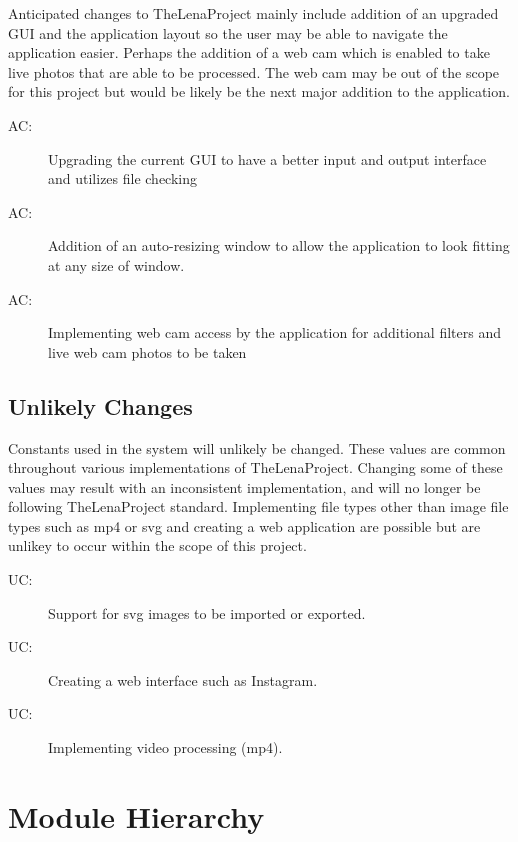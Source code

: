 \documentclass[12pt, titlepage]{article}
\newcounter{acnum}
\newcommand{\actheacnum}{AC\theacnum}
\newcounter{ucnum}
\newcommand{\uctheucnum}{UC\theucnum}
\begin{document}
Anticipated changes to TheLenaProject mainly include addition of an upgraded GUI and the application layout so the user may be able to navigate the application easier. Perhaps the addition of a web cam which is enabled to take live photos that are able to be processed. The web cam may be out of the scope for this project but would be likely be the next major addition to the application.

\begin{description}
\item[ \actheacnum \label{acHardware}:] Upgrading the current GUI to have a better input and output interface and utilizes file checking
\item[ \actheacnum \label{acInput}:] Addition of an auto-resizing window to allow the application to look fitting at any size of window.
\item[ \actheacnum \label{acInput}:] Implementing web cam access by the application for additional filters and live web cam photos to be taken
\end{description}

\subsection{Unlikely Changes} \label{SecUchange}

Constants used in the system will unlikely be changed. These values are common throughout
various implementations of TheLenaProject. Changing some of these values may result with an
inconsistent implementation, and will no longer be following TheLenaProject standard. Implementing file types other than image file types such as mp4 or svg and creating a web application are possible but are unlikey to occur within the scope of this project.
\\

\begin{description}
\item[ \uctheucnum \label{ucIO}:] Support for svg images to be imported or exported.
\item[ \uctheucnum \label{ucInput}:] Creating a web interface such as Instagram.
\item[ \uctheucnum \label{ucInput}:] Implementing video processing (mp4).
\end{description}

\section{Module Hierarchy} \label{SecMH}
\end{document}

